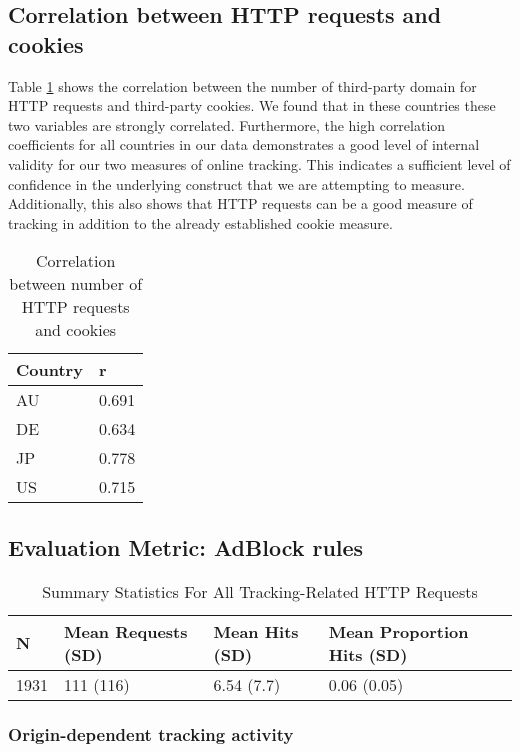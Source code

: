 \documentclass[conference]{IEEEtran}
\begin{document}
\subsection{Correlation between HTTP requests and cookies}
Table \ref{correlation} shows the correlation between the number of third-party domain for HTTP requests and third-party cookies. We found that in these countries these two variables are strongly correlated. Furthermore, the high correlation coefficients for all countries in our data demonstrates a good level of internal validity for our two measures of online tracking. This indicates a sufficient level of confidence in the underlying construct that we are attempting to measure. Additionally, this also shows that HTTP requests can be a good measure of tracking in addition to the already established cookie measure.
 
\begin{table}[t]
\centering
\caption{Correlation between number of HTTP requests and cookies}
\label{correlation}
\begin{tabular}{|l|l|}
\hline
\textbf{Country} & \textbf{r} \\ \hline
AU               & 0.691      \\ \hline
DE               & 0.634      \\ \hline
JP               & 0.778      \\ \hline
US               & 0.715   \\  \hline
\end{tabular}
\end{table}


\subsection{Evaluation Metric: AdBlock rules}


\begin{table*}[t]
\centering
\caption{Summary Statistics For All Tracking-Related HTTP Requests}
\label{summaryTracking}
\begin{tabular}{|l|l|l|l|}
\hline
\textbf{N} & \textbf{Mean Requests (SD)} & \textbf{Mean Hits (SD)} & \textbf{Mean Proportion Hits (SD)} \\ \hline
1931       & 111 (116)                   & 6.54 (7.7)              & 0.06 (0.05)                        \\ \hline
\end{tabular}
\end{table*}


\subsubsection{Origin-dependent tracking activity}
\end{document}
